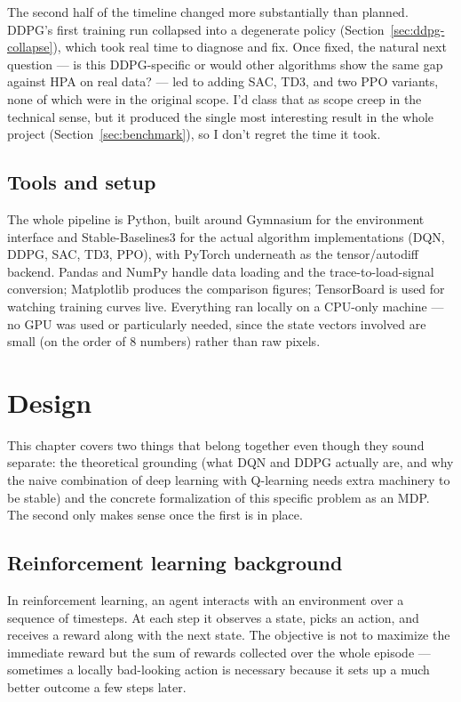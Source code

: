 \documentclass{rapportINPTCLOUD}
\begin{document}
The second half of the timeline changed more substantially than planned. DDPG's first training run collapsed into a degenerate policy (Section~\ref{sec:ddpg-collapse}), which took real time to diagnose and fix. Once fixed, the natural next question — is this DDPG-specific or would other algorithms show the same gap against HPA on real data? — led to adding SAC, TD3, and two PPO variants, none of which were in the original scope. I'd class that as scope creep in the technical sense, but it produced the single most interesting result in the whole project (Section~\ref{sec:benchmark}), so I don't regret the time it took.

\section{Tools and setup}

The whole pipeline is Python, built around Gymnasium for the environment interface and Stable-Baselines3 for the actual algorithm implementations (DQN, DDPG, SAC, TD3, PPO), with PyTorch underneath as the tensor/autodiff backend. Pandas and NumPy handle data loading and the trace-to-load-signal conversion; Matplotlib produces the comparison figures; TensorBoard is used for watching training curves live. Everything ran locally on a CPU-only machine — no GPU was used or particularly needed, since the state vectors involved are small (on the order of 8 numbers) rather than raw pixels.

\chapter{Design}
\label{chap:design}

This chapter covers two things that belong together even though they sound separate: the theoretical grounding (what DQN and DDPG actually are, and why the naive combination of deep learning with Q-learning needs extra machinery to be stable) and the concrete formalization of this specific problem as an MDP. The second only makes sense once the first is in place.

\section{Reinforcement learning background}

In reinforcement learning, an agent interacts with an environment over a sequence of timesteps. At each step it observes a state, picks an action, and receives a reward along with the next state. The objective is not to maximize the immediate reward but the sum of rewards collected over the whole episode — sometimes a locally bad-looking action is necessary because it sets up a much better outcome a few steps later.
\end{document}
